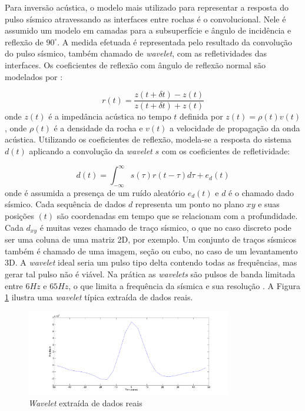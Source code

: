 Para inversão acústica, o modelo mais utilizado para representar a resposta do
pulso sísmico atravessando as interfaces entre rochas é o convolucional. Nele é
assumido um modelo em camadas para a subsuperfície e ângulo de incidência e
reflexão de $90^\circ$. A medida efetuada é representada pelo resultado da
convolução do pulso sísmico, também chamado de \textit{wavelet}, com as
refletividades das interfaces. Os coeficientes de reflexão com ângulo de
reflexão normal são modelados por \citep[p. 69]{sen_livro}:

\begin{equation}
r(t) = \frac{z(t+\delta t)-z(t)}{z(t+\delta t)+z(t)}
\end{equation}
onde $z(t)$ é a impedância acústica no tempo $t$ definida por
$z(t)=\rho(t)v(t)$, onde $\rho(t)$ é a densidade da rocha e $v(t)$ a
velocidade de propagação da onda acústica. Utilizando os coeficientes de
reflexão, modela-se a resposta do sistema $d(t)$ aplicando a convolução
da \textit{wavelet} $s$ com os coeficientes de refletividade:

\begin{equation}
d(t) = \int_{-\infty}^{\infty} s(\tau)r(t-\tau)d\tau + e_d(t)
\end{equation}
onde é assumida a presença de um ruído aleatório $e_d(t)$ e $d$ é o chamado dado
sísmico. Cada sequência de dados $d$ representa um ponto no plano $xy$ e suas
posições $(t)$ são coordenadas em tempo que se relacionam com a profundidade.
Cada $d_{xy}$ é muitas vezes chamado de traço sísmico, o que no caso discreto
pode ser uma coluna de uma matriz 2D, por exemplo. Um conjunto de traços
sísmicos também é chamado de uma imagem, seção ou cubo, no caso de um
levantamento 3D. A \textit{wavelet} ideal seria um pulso tipo delta contendo
todas as frequências, mas gerar tal pulso não é viável. Na prática as
\textit{wavelets} são pulsos de banda limitada entre $6Hz$ e $65Hz$, o que
limita a frequência da sísmica e sua resolução \citep[p. 11]{sen_livro}.
A Figura \ref{fig:wavelet} ilustra uma \textit{wavelet} típica extraída de dados
reais.

\begin{figure}[htp]
\begin{center}
  \includegraphics[width=0.8\textwidth]{fig/wavelet}
  \caption{\textit{Wavelet} extraída de dados reais}
  \label{fig:wavelet}
\end{center}
\end{figure}

